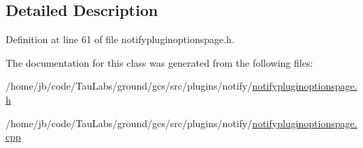 \subsection{\-Detailed \-Description}


\-Definition at line 61 of file notifypluginoptionspage.\-h.



\-The documentation for this class was generated from the following files\-:\begin{DoxyCompactItemize}
\item 
/home/jb/code/\-Tau\-Labs/ground/gcs/src/plugins/notify/\hyperlink{notifypluginoptionspage_8h}{notifypluginoptionspage.\-h}\item 
/home/jb/code/\-Tau\-Labs/ground/gcs/src/plugins/notify/\hyperlink{notifypluginoptionspage_8cpp}{notifypluginoptionspage.\-cpp}\end{DoxyCompactItemize}
